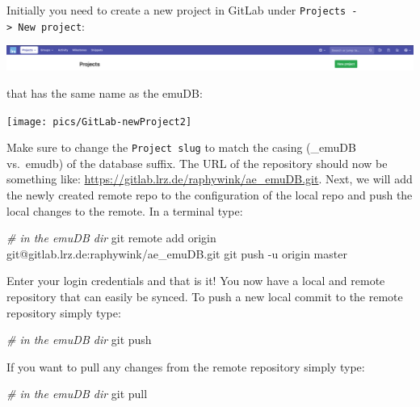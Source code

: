 \documentclass[]{book}
\newenvironment{Shaded}{\begin{snugshade}}{\end{snugshade}}
\newcommand{\CommentTok}[1]{\textcolor[rgb]{0.56,0.35,0.01}{\textit{#1}}}
\newcommand{\FunctionTok}[1]{\textcolor[rgb]{0.00,0.00,0.00}{#1}}
\newcommand{\NormalTok}[1]{#1}
\begin{document}
Initially you need to create a new project in GitLab under \texttt{Projects\ -\textgreater{}\ New\ project}:

\begin{center}\includegraphics[width=0.75\linewidth]{pics/GitLab-newProject1} \end{center}

that has the same name as the emuDB:

\begin{center}\texttt{[image: pics/GitLab-newProject2]} \end{center}

Make sure to change the \texttt{Project\ slug} to match the casing (\_emuDB vs.~emudb) of the database suffix. The URL of the repository should now be something like: \url{https://gitlab.lrz.de/raphywink/ae_emuDB.git}. Next, we will add the newly created remote repo to the configuration of the local repo and push the local changes to the remote. In a terminal type:

\begin{Shaded}
\begin{Highlighting}[]
\CommentTok{# in the emuDB dir}
\FunctionTok{git}\NormalTok{ remote add origin git@gitlab.lrz.de:raphywink/ae_emuDB.git}
\FunctionTok{git}\NormalTok{ push -u origin master}
\end{Highlighting}
\end{Shaded}

Enter your login credentials and that is it! You now have a local and remote repository that can easily be synced. To push a new local commit to the remote repository simply type:

\begin{Shaded}
\begin{Highlighting}[]
\CommentTok{# in the emuDB dir}
\FunctionTok{git}\NormalTok{ push}
\end{Highlighting}
\end{Shaded}

If you want to pull any changes from the remote repository simply type:

\begin{Shaded}
\begin{Highlighting}[]
\CommentTok{# in the emuDB dir}
\FunctionTok{git}\NormalTok{ pull}
\end{Highlighting}
\end{Shaded}
\end{document}
